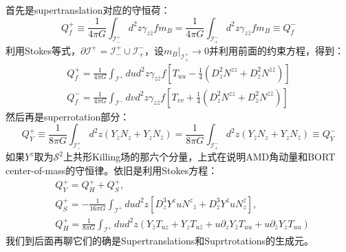 首先是supertranslation对应的守恒荷：
\begin{equation}
	Q_{f}^{+} \equiv\frac{1}{4\pi G}\int_{{\mathcal I}_{-}^{+}}d^{2}z\gamma_{z\bar{z}}fm_{B}=
	\frac{1}{4\pi G}\int_{\mathcal{I}_{+}^{-}}d^{2}z\gamma_{z\bar{z}}fm_{B}\equiv Q_{f}^{-} 
\end{equation}
利用Stokes等式，$\partial\mathcal{I}^+=\mathcal{I}^+_-\cup\mathcal{I}^-_+$，设$m_B|_{\mathcal{I}^+_+}\to 0$并利用前面的约束方程，得到：
\begin{equation}
	\begin{gathered}
		Q_{f}^{+} =\frac1{4\pi G}\int_{\mathcal{I}^+}dud^2z\gamma_{z\bar{z}}f\left[T_{uu}-\frac14\left(D_z^2N^{zz}+D_{\bar{z}}^2N^{\bar{z}\bar{z}}\right)\right] \\
		Q_{f}^{-} =\frac1{4\pi G}\int_{\mathcal{I}^-}dvd^2z\gamma_{z\bar{z}}f\left[T_{vv}+\frac14\left(D_z^2N^{zz}+D_{\bar{z}}^2N^{\bar{z}\bar{z}}\right)\right] 
	\end{gathered}
\end{equation}
然后再是superrotation部分：
\begin{equation}
	Q_{Y}^{+}\equiv\frac{1}{8\pi G}\int_{\mathcal I_{-}^{+}}d^{2}z(Y_{\bar{z}}N_{z}+Y_{z}N_{\bar{z}})=\frac{1}{8\pi G}\int_{\mathcal I_{+}^{-}}d^{2}z(Y_{\bar{z}}N_{z}+Y_{z}N_{\bar{z}})\equiv Q_{Y}^{-}
\end{equation}
如果$Y^z$取为$\mathcal{S}^2$上共形Killing场的那六个分量，上式在说明AMD角动量和BORT center-of-mass的守恒律。依旧是利用Stokes方程：
\begin{equation}
	\begin{aligned}
		&Q_{Y}^{+} =Q_{H}^{+}+Q_{S}^{+},  \\
		&Q_{S}^{+} =-\frac{1}{16\pi G}\int_{\mathcal{I}^{+}}dud^{2}z[D_{z}^{3}Y^{z}uN^{z}{}_{\bar{z}}+D_{\bar{z}}^{3}Y^{\bar{z}}uN^{\bar{z}}_{z}],  \\
		&Q_{H}^{+} =\frac{1}{8\pi G}\int_{\mathcal{I}^{+}}dud^{2}z(Y_{\bar{z}}T_{uz}+Y_{z}T_{u\bar{z}}+u\partial_{z}Y_{\bar{z}}T_{uu}+u\partial_{\bar{z}}Y_{z}T_{uu}) 
	\end{aligned}
\end{equation}
我们到后面再聊它们的确是Supertranslations和Suprtrotations的生成元。